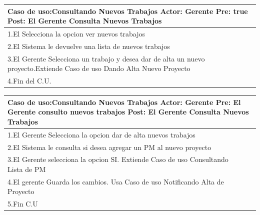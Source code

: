 \begin{longtable}{|p{}|p{}|}
    \hline
    \multicolumn{2}{|p{16cm}|}{
        \textbf{Caso de uso:}Consultando Nuevos Trabajos\newline
        \textbf{Actor:} Gerente\newline
        \textbf{Pre: }true\newline
        \textbf{Post:}  El Gerente Consulta Nuevos Trabajos
    }\\
    \hline
    1.El Selecciona la opcion ver nuevos trabajos&    \\
    \hline
    2.El Sistema le devuelve una lista de nuevos trabajos& \\
    \hline
    3.El Gerente Selecciona un trabajo y desea dar de alta un nuevo proyecto.Extiende Caso de uso Dando Alta Nuevo Proyecto\\
    \hline
    4.Fin del C.U.&\\
    \hline
\end{longtable}

\begin{longtable}{|p{}|p{}|}
    \hline
    \multicolumn{2}{|p{16cm}|}{
        \textbf{Caso de uso:}Consultando Nuevos Trabajos\newline
        \textbf{Actor:} Gerente\newline
        \textbf{Pre: }El Gerente consulto nuevos trabajos\newline
        \textbf{Post:}  El Gerente Consulta Nuevos Trabajos
    }\\
    \hline
    1.El Gerente Selecciona  la opcion dar de alta nuevos trabajos&    \\
    \hline
    2.El Sistema le consulta si desea agregar un PM al nuevo proyecto& \\
    \hline
    3.El Gerente selecciona la opcion SI. Extiende Caso de uso Consultando Lista de PM\\
    \hline
    4.El gerente Guarda los cambios. Usa Caso de uso Notificando Alta de Proyecto&\\
    \hline
    5.Fin C.U&\\
    \hline
\end{longtable}

